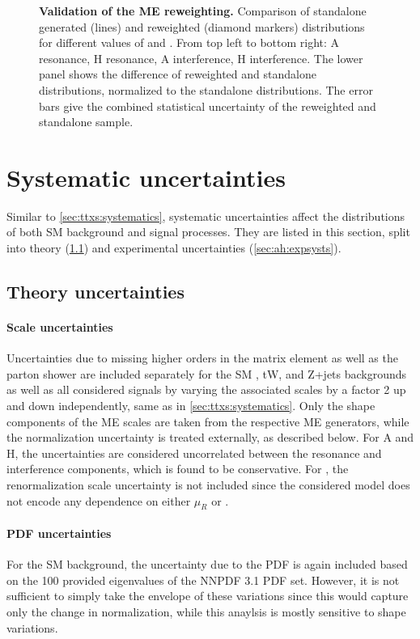 \begin{figure}[!p]
    \caption{\textbf{Validation of the ME reweighting.} Comparison of standalone generated (lines) and reweighted (diamond markers) \mtt distributions for different values of \mAH and \wAH. From top left to bottom right: A resonance, H resonance, A interference, H interference. The lower panel shows the difference of reweighted and standalone distributions, normalized to the standalone distributions. The error bars give the combined statistical uncertainty of the reweighted and standalone sample.}
    \label{fig:ah:merew_validation}
\end{figure}

\section{Systematic uncertainties}
\label{sec:ah:systs}

Similar to \cref{sec:ttxs:systematics}, systematic uncertainties affect the distributions of both SM background and signal processes. They are listed in this section, split into theory (\cref{sec:ah:theorysysts}) and experimental uncertainties (\cref{sec:ah:expsysts}).

\subsection{Theory uncertainties}
\label{sec:ah:theorysysts}

\paragraph{Scale uncertainties}
Uncertainties due to missing higher orders in the matrix element as well as the parton shower are included separately for the SM \ttbar, tW, and Z+jets backgrounds as well as all considered signals by varying the associated scales by a factor 2 up and down independently, same as in \cref{sec:ttxs:systematics}. Only the shape components of the ME scales are taken from the respective ME generators, while the normalization uncertainty is treated externally, as described below. For A and H, the uncertainties are considered uncorrelated between the resonance and interference components, which is found to be conservative. For \etat, the renormalization scale uncertainty is not included since the considered model does not encode any dependence on either $\mu_R$ or \alphas.

\paragraph{PDF uncertainties}
For the SM \ttbar background, the uncertainty due to the PDF is again included based on the 100 provided eigenvalues of the NNPDF 3.1 PDF set. However, it is not sufficient to simply take the envelope of these variations since this would capture only the change in \ttbar normalization, while this anaylsis is mostly sensitive to shape variations.


